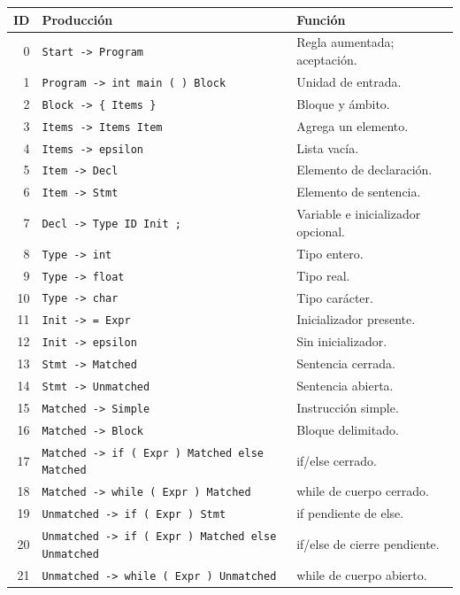 \begin{longtable}{@{}r p{10.2cm} p{4.6cm}@{}}\toprule ID & Producción & Función\\\midrule\endhead
0 & \texttt{Start -\textgreater{} Program} & Regla aumentada; aceptación.\\
1 & \texttt{Program -\textgreater{} int main ( ) Block} & Unidad de entrada.\\
2 & \texttt{Block -\textgreater{} \{ Items \}} & Bloque y ámbito.\\
3 & \texttt{Items -\textgreater{} Items Item} & Agrega un elemento.\\
4 & \texttt{Items -\textgreater{} epsilon} & Lista vacía.\\
5 & \texttt{Item -\textgreater{} Decl} & Elemento de declaración.\\
6 & \texttt{Item -\textgreater{} Stmt} & Elemento de sentencia.\\
7 & \texttt{Decl -\textgreater{} Type ID Init ;} & Variable e inicializador opcional.\\
8 & \texttt{Type -\textgreater{} int} & Tipo entero.\\
9 & \texttt{Type -\textgreater{} float} & Tipo real.\\
10 & \texttt{Type -\textgreater{} char} & Tipo carácter.\\
11 & \texttt{Init -\textgreater{} = Expr} & Inicializador presente.\\
12 & \texttt{Init -\textgreater{} epsilon} & Sin inicializador.\\
13 & \texttt{Stmt -\textgreater{} Matched} & Sentencia cerrada.\\
14 & \texttt{Stmt -\textgreater{} Unmatched} & Sentencia abierta.\\
15 & \texttt{Matched -\textgreater{} Simple} & Instrucción simple.\\
16 & \texttt{Matched -\textgreater{} Block} & Bloque delimitado.\\
17 & \texttt{Matched -\textgreater{} if ( Expr ) Matched else Matched} & if/else cerrado.\\
18 & \texttt{Matched -\textgreater{} while ( Expr ) Matched} & while de cuerpo cerrado.\\
19 & \texttt{Unmatched -\textgreater{} if ( Expr ) Stmt} & if pendiente de else.\\
20 & \texttt{Unmatched -\textgreater{} if ( Expr ) Matched else Unmatched} & if/else de cierre pendiente.\\
21 & \texttt{Unmatched -\textgreater{} while ( Expr ) Unmatched} & while de cuerpo abierto.\\

\end{longtable}
